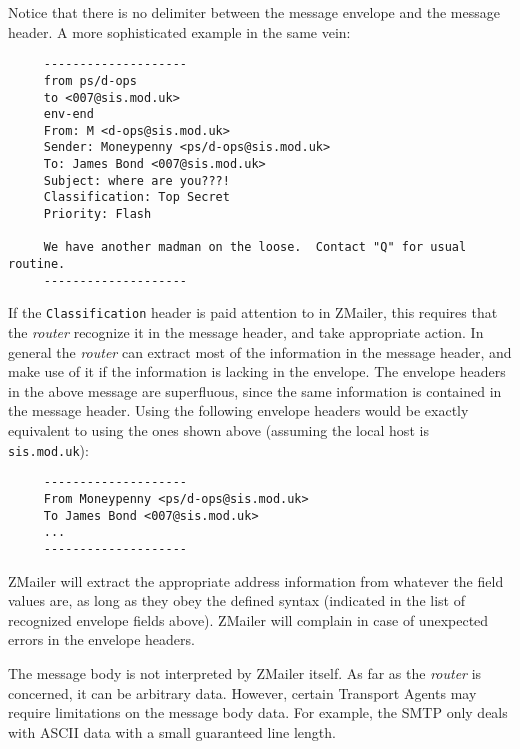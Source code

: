 Notice that there is no delimiter between the message envelope and the
message header.  A more sophisticated example in the same vein:

\begin{tscreen}
\begin{verbatim}
     --------------------
     from ps/d-ops
     to <007@sis.mod.uk>
     env-end
     From: M <d-ops@sis.mod.uk>
     Sender: Moneypenny <ps/d-ops@sis.mod.uk>
     To: James Bond <007@sis.mod.uk>
     Subject: where are you???!
     Classification: Top Secret
     Priority: Flash
     
     We have another madman on the loose.  Contact "Q" for usual routine.
     --------------------
\end{verbatim}
\end{tscreen}


If the {\tt Classification} header is paid attention to in ZMailer, this
requires that the {\em router\/} recognize it in the message header, and take
appropriate action.  In general the {\em router\/} can extract most of the
information in the message header, and make use of it if the information is
lacking in the envelope.  The envelope headers in the above message are
superfluous, since the same information is contained in the message header.
Using the following envelope headers would be exactly equivalent to using
the ones shown above (assuming the local host is {\tt sis.mod.uk}):

\begin{tscreen}
\begin{verbatim}
     --------------------
     From Moneypenny <ps/d-ops@sis.mod.uk>
     To James Bond <007@sis.mod.uk>
     ...
     --------------------
\end{verbatim}
\end{tscreen}


ZMailer will extract the appropriate address information from whatever the
field values are, as long as they obey the defined syntax (indicated in the
list of recognized envelope fields above).  ZMailer will complain in case
of unexpected errors in the envelope headers.

The message body is not interpreted by ZMailer itself.  As far as the
{\em router\/} is concerned, it can be arbitrary data.  However, certain Transport
Agents may require limitations on the message body data. For example, the
SMTP only deals with ASCII data with a small guaranteed line length.










